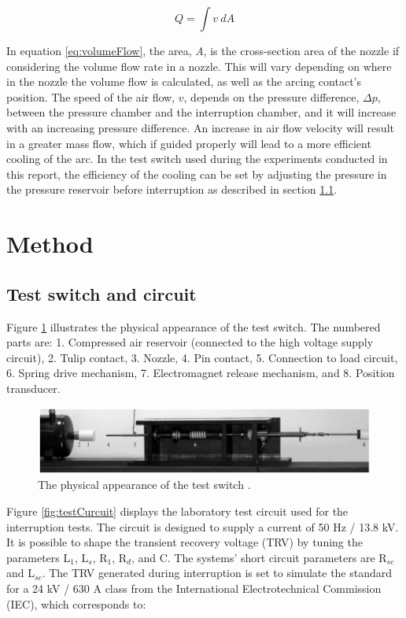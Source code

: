 \documentclass[10pt,b5paper,twoside]{article}
\begin{document}
\begin{equation} \label{eq:volumeFlow}
Q=\int v \ dA
\end{equation}

In equation \eqref{eq:volumeFlow}, the area, \textit{A}, is the cross-section area of the nozzle if considering the volume flow rate in a nozzle. This will vary depending on where in the nozzle the volume flow is calculated, as well as the arcing contact's position. The speed of the air flow, $v$, depends on the pressure difference, $\Delta p$, between the pressure chamber and the interruption chamber, and it will increase with an increasing pressure difference. An increase in air flow velocity will result in a greater mass flow, which if guided properly will lead to a more efficient cooling of the arc. In the test switch used during the experiments conducted in this report, the efficiency of the cooling can be set by adjusting the pressure in the pressure reservoir before interruption as described in section \ref{sec:testCir}.

\cleardoublepage
\section{Method}

\subsection{Test switch and circuit} \label{sec:testCir}

Figure \ref{fig:testSwitchRiggEq} illustrates the physical appearance of the test switch. The numbered parts are: 1. Compressed air reservoir (connected to the high voltage supply circuit), 2. Tulip contact, 3. Nozzle, 4. Pin contact, 5. Connection to load circuit, 6. Spring drive mechanism, 7. Electromagnet release mechanism, and 8. Position transducer.

\begin{figure} [H]
\centering
\includegraphics[scale=0.43]{Bilder/Method/switchTest.png}
\caption{The physical appearance of the test switch \cite{bib:AFIMVLBA}.} \label{fig:testSwitchRiggEq}
\end{figure}

Figure \ref{fig:testCurcuit} displays the laboratory test circuit used for the interruption tests. The circuit is designed to supply a current of 50 Hz / 13.8 kV. It is possible to shape the transient recovery voltage (TRV) by tuning the parameters L$_1$, L$_s$, R$_1$, R$_d$, and C. The systems' short circuit parameters are R$_{sc}$ and L$_{sc}$. The TRV generated during interruption is set to simulate the standard for a 24 kV / 630 A class from the International Electrotechnical Commission (IEC), which corresponds to:
\end{document}
